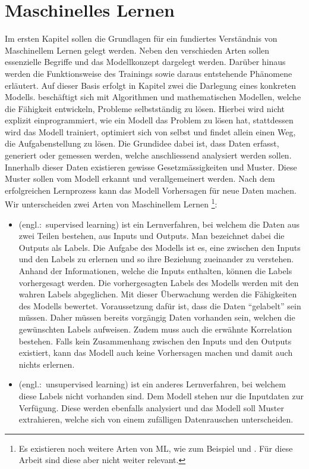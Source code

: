 \chapter{Maschinelles Lernen}

Im ersten Kapitel sollen die Grundlagen für ein fundiertes Verständnis
von Maschinellem Lernen gelegt werden. Neben den verschieden Arten sollen
essenzielle Begriffe und das Modellkonzept dargelegt werden. Darüber hinaus werden
die Funktionsweise des Trainings sowie daraus entstehende Phänomene erläutert.
Auf dieser Basis erfolgt in Kapitel zwei die Darlegung eines konkreten Modells.
\para{}
\bigskip
{} beschäftigt sich mit Algorithmen und
mathematischen Modellen, welche die Fähigkeit entwickeln, Probleme selbstständig
zu lösen.
Hierbei wird nicht explizit einprogrammiert, wie ein Modell das Problem zu lösen
hat, stattdessen wird das Modell trainiert, optimiert sich von selbst und findet allein
einen Weg, die Aufgabenstellung zu lösen.
Die Grundidee dabei ist, dass Daten erfasst, generiert oder gemessen werden,
welche anschliessend analysiert werden sollen.
Innerhalb dieser Daten existieren gewisse
Gesetzmässigkeiten und Muster. Diese Muster sollen vom Modell
erkannt und verallgemeinert werden. Nach dem erfolgreichen Lernprozess
kann das Modell Vorhersagen für neue Daten machen.
\para{}
Wir unterscheiden zwei Arten von Maschinellem Lernen%
\footnote{
  Es existieren noch weitere Arten von ML, wie zum Beispiel
   und
  . Für diese Arbeit sind diese aber nicht
  weiter relevant.
}:
\begin{itemize}
\item{
     (engl.:\ supervised learning) ist ein
    Lernverfahren, bei welchem die Daten aus zwei Teilen bestehen, aus Inputs und
    Outputs. Man bezeichnet dabei die Outputs als Labels. Die Aufgabe des Modells
    ist es, eine  zwischen den Inputs und den Labels zu
    erlernen und so ihre Beziehung zueinander zu verstehen.
    Anhand der Informationen, welche die Inputs enthalten,
    können die Labels vorhergesagt werden. Die vorhergesagten Labels des Modells
    werden mit den wahren Labels abgeglichen. Mit dieser Überwachung werden die
    Fähigkeiten des Modells bewertet.
    \para{}
    Voraussetzung dafür ist, dass die Daten ``gelabelt'' sein müssen.
    Daher müssen bereits vorgängig Daten vorhanden sein, welchen die gewünschten
    Labels aufweisen. Zudem muss auch die erwähnte Korrelation bestehen. Falls
    kein Zusammenhang zwischen den Inputs und den Outputs existiert, kann das
    Modell auch keine Vorhersagen machen und damit auch nichts erlernen.
  }
\item{
     (engl.:\ unsupervised learning) ist ein anderes
    Lernverfahren, bei welchem diese Labels nicht vorhanden sind. Dem
    Modell stehen nur die Inputdaten zur Verfügung. Diese werden ebenfalls analysiert
    und das Modell soll Muster extrahieren, welche sich von einem
    zufälligen Datenrauschen unterscheiden.
  }
\end{itemize}


